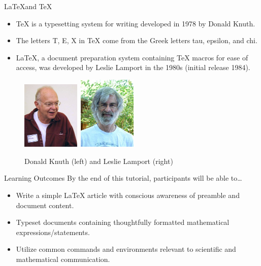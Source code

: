 \documentclass{beamer}
\begin{document}
\begin{frame}{\LaTeX and \TeX}
	\begin{multicols}{2}
		\begin{itemize}
			\item<1-> TeX is a typesetting system for  writing developed in 1978 by Donald Knuth.
			\item<2-> The letters T, E, X in TeX come from the Greek letters tau, epsilon, and chi.
			\item<3-> LaTeX, a document preparation system containing TeX macros for ease of access, was developed by Leslie Lamport in the 1980s (initial release 1984).
		\end{itemize}
	\columnbreak
		\begin{figure}
			\includegraphics[width = 2.75cm]{don_knuth.png}\ \includegraphics[width = 2.75cm]{les_lamport.png}
			\caption{Donald Knuth (left) and Leslie Lamport (right)}
		\end{figure}
	\end{multicols}
\end{frame}

\begin{frame}{Learning Outcomes}
	By the end of this tutorial, participants will be able to\dots
	\begin{itemize}
		\item Write a simple LaTeX article with conscious awareness of preamble and document content.
		\item Typeset documents containing thoughtfully formatted mathematical expressions/statements.
		\item Utilize common commands and environments relevant to scientific and mathematical communication.
	\end{itemize}
\end{frame}
\end{document}
